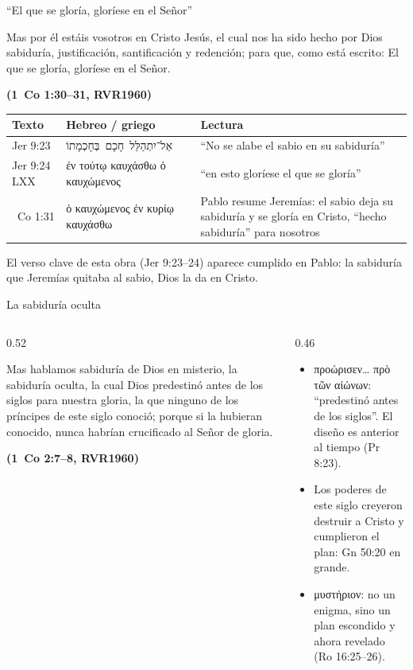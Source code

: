 \documentclass[hyperref={bookmarks=false},aspectratio=169]{beamer}
\newcommand{\heb}[1]{\mbox{\foreignlanguage{hebrew}{#1}}}
\newcommand{\grc}[1]{\foreignlanguage{ancientgreek}{#1}}
\newcommand{\fuente}[1]{\par\hfill{\upshape\bfseries\footnotesize\textcolor{azul}{#1}}}
\begin{document}
\begin{frame}{``El que se gloría, gloríese en el Señor''}
\begin{cita}Mas por él estáis vosotros en Cristo Jesús, el cual nos ha sido hecho por Dios sabiduría, justificación, santificación y redención; para que, como está escrito: El que se gloría, gloríese en el Señor.\fuente{(1~Co 1:30--31, RVR1960)}\end{cita}
\scriptsize\renewcommand{\arraystretch}{1.2}
\begin{tabular}{@{}>{\RaggedRight\arraybackslash}p{2.0cm}>{\RaggedRight\arraybackslash}p{4.8cm}>{\RaggedRight\arraybackslash}p{4.9cm}@{}}
\toprule
\textbf{Texto} & \textbf{Hebreo / griego} & \textbf{Lectura} \\ \midrule
Jer 9:23 & \heb{אַל־יִתְהַלֵּל חָכָם בְּחָכְמָתוֹ} & ``No se alabe el sabio en su sabiduría'' \\
Jer 9:24 LXX & \grc{ἐν τούτῳ καυχάσθω ὁ καυχώμενος} & ``en esto gloríese el que se gloría'' \\
1~Co 1:31 & \grc{ὁ καυχώμενος ἐν κυρίῳ καυχάσθω} & Pablo resume Jeremías: el sabio deja su sabiduría y se gloría en Cristo, ``hecho sabiduría'' para nosotros \\
\bottomrule
\end{tabular}\par\medskip
\small\RaggedRight El verso clave de esta obra (Jer 9:23--24) aparece cumplido en Pablo: la sabiduría que Jeremías quitaba al sabio, Dios la da en Cristo.
\end{frame}

\begin{frame}{La sabiduría oculta}
\begin{columns}[t,onlytextwidth]
\begin{column}{0.52\textwidth}
\begin{cita}Mas hablamos sabiduría de Dios en misterio, la sabiduría oculta, la cual Dios predestinó antes de los siglos para nuestra gloria, la que ninguno de los príncipes de este siglo conoció; porque si la hubieran conocido, nunca habrían crucificado al Señor de gloria.\fuente{(1~Co 2:7--8, RVR1960)}\end{cita}
\end{column}
\begin{column}{0.46\textwidth}\small
\begin{itemize}
\item \grc{προώρισεν\ldots{} πρὸ τῶν αἰώνων}: ``predestinó antes de los siglos''. El diseño es anterior al tiempo (Pr 8:23).
\item Los poderes de este siglo creyeron destruir a Cristo y cumplieron el plan: Gn 50:20 en grande.
\item \grc{μυστήριον}: no un enigma, sino un plan escondido y ahora revelado (Ro 16:25--26).
\end{itemize}
\end{column}
\end{columns}
\end{frame}
\end{document}
